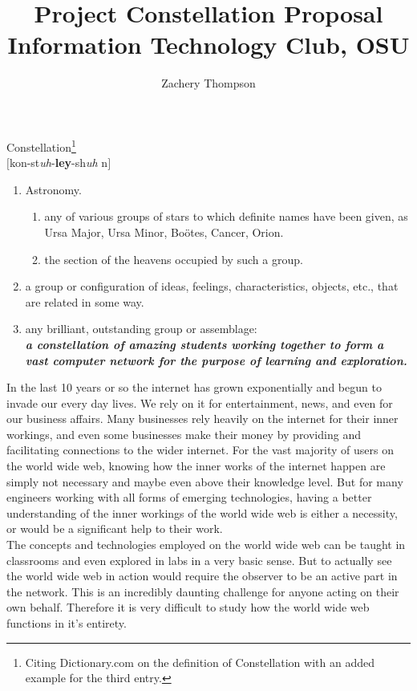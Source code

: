 \documentclass[12pt]{article}
\title{
Project Constellation Proposal
\\
Information Technology Club, OSU
}
\author{Zachery Thompson}
\begin{document}
\maketitle{}
\clearpage{}

\begin{center}
Constellation\footnote{Citing Dictionary.com on the definition of Constellation with an added example for the third entry.}
\\
$[$kon-st\textit{uh}-\textbf{ley}-sh\textit{uh} n$]$
\\
\end{center}
\begin{enumerate}
	\item Astronomy.
	\begin{enumerate}
		\item any of various groups of stars to which definite names have been given, as Ursa Major, Ursa Minor, Bo\"{o}tes, Cancer, Orion.
		\item the section of the heavens occupied by such a group.
	\end{enumerate}
	\item a group or configuration of ideas, feelings, characteristics, objects, etc., that are related in some way.
	\item any brilliant, outstanding group or assemblage:\\
	\textbf{\textit{a constellation of amazing students working together to form a vast computer network for the purpose of learning and exploration.}}
\end{enumerate}
\clearpage{}

In the last 10 years or so the internet has grown exponentially and begun to invade our every day lives. 
We rely on it for entertainment, news, and even for our business affairs. Many businesses
rely heavily on the internet for their inner workings, and even some businesses make their money by providing
and facilitating connections to the wider internet. For the vast majority of users on the world wide web, 
knowing how the inner works of the internet happen are simply not necessary and maybe even above their
knowledge level. But for many engineers working with all forms of emerging technologies, having a better
understanding of the inner workings of the world wide web is either a necessity, or would be a significant help
to their work.  
\\

The concepts and technologies employed on the world wide web can be taught in classrooms and even explored in
labs in a very basic sense. But to actually see the world wide web in action would require the observer to
be an active part in the network. This is an incredibly daunting challenge for anyone acting on their own 
behalf. Therefore it is very difficult to study how the world wide web functions in it's entirety.
\end{document}

